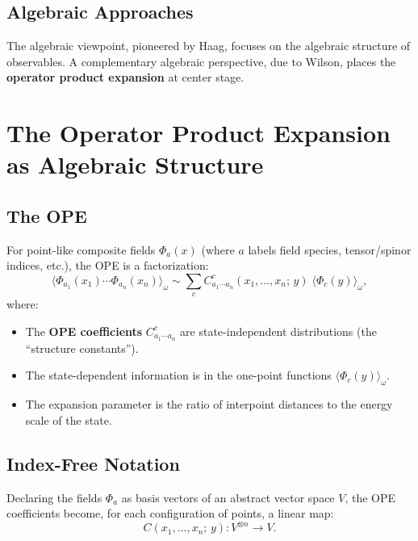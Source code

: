 \documentclass[11pt,a4paper]{article}
\begin{document}
\subsection{Algebraic Approaches}

The algebraic viewpoint, pioneered by Haag, focuses on the algebraic
structure of observables. A complementary algebraic perspective, due to
Wilson, places the \textbf{operator product expansion} at center stage.

\section{The Operator Product Expansion as Algebraic Structure}

\subsection{The OPE}

For point-like composite fields $\Phi_a(x)$ (where $a$ labels field species,
tensor/spinor indices, etc.), the OPE is a factorization:
\begin{equation}
  \langle \Phi_{a_1}(x_1) \cdots \Phi_{a_n}(x_n) \rangle_\omega
  \sim \sum_c C^c_{a_1\cdots a_n}(x_1,\ldots,x_n;\,y)\;
  \langle \Phi_c(y) \rangle_\omega,
\end{equation}
where:
\begin{itemize}[nosep]
  \item The \textbf{OPE coefficients} $C^c_{a_1\cdots a_n}$ are state-independent
        distributions (the ``structure constants'').
  \item The state-dependent information is in the one-point functions
        $\langle \Phi_c(y)\rangle_\omega$.
  \item The expansion parameter is the ratio of interpoint distances to
        the energy scale of the state.
\end{itemize}

\subsection{Index-Free Notation}

Declaring the fields $\Phi_a$ as basis vectors of an abstract vector
space $V$, the OPE coefficients become, for each configuration of points,
a linear map:
\begin{equation}
  C(x_1,\ldots,x_n;\,y): V^{\otimes n} \longrightarrow V.
\end{equation}
\end{document}
